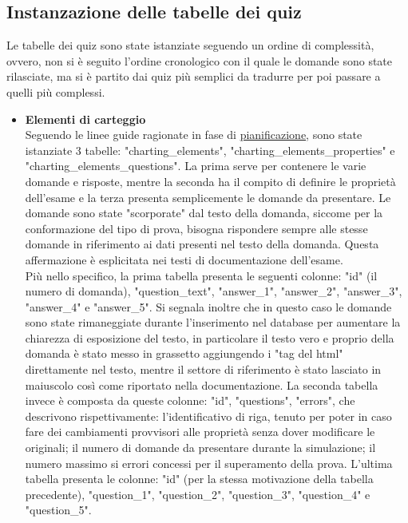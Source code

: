\subsection{Instanzazione delle tabelle dei quiz}
Le tabelle dei quiz sono state istanziate seguendo un ordine di complessità, ovvero, non si è seguito l'ordine cronologico con il quale le domande sono state rilasciate, ma si è partito dai quiz più semplici da tradurre per poi passare a quelli più complessi.\\
\begin{itemize}
	\item \textbf{Elementi di carteggio}\\
	Seguendo le linee guide ragionate in fase di  \hyperref[cap:Introduzione]{pianificazione}, sono state istanziate 3 tabelle: "charting_elements",  "charting_elements_properties" e "charting_elements_questions". La prima serve per contenere le varie domande e risposte, mentre la seconda ha il compito di definire le proprietà dell'esame e la terza presenta semplicemente le domande da presentare. Le domande sono state "scorporate" dal testo della domanda, siccome per la conformazione del tipo di prova, bisogna rispondere sempre alle stesse domande in riferimento ai dati presenti nel testo della domanda. Questa affermazione è esplicitata nei testi di documentazione dell'esame.\\ 
	Più nello specifico, la prima tabella presenta le seguenti colonne: "id" (il numero di domanda), "question_text", "answer_1", "answer_2", "answer_3", "answer_4" e "answer_5". Si segnala inoltre che in questo caso le domande sono state rimaneggiate durante l'inserimento nel database per aumentare la chiarezza di esposizione del testo, in particolare il testo vero e proprio della domanda è stato messo in grassetto aggiungendo i "tag del html" direttamente nel testo, mentre il settore di riferimento è stato lasciato in maiuscolo così come riportato nella documentazione. La seconda tabella invece è composta da queste colonne: "id", "questions", "errors", che descrivono rispettivamente: l'identificativo di riga, tenuto per poter in caso fare dei cambiamenti provvisori alle proprietà senza dover modificare le originali; il numero di domande da presentare durante la simulazione; il numero massimo si errori concessi per il superamento della prova. L'ultima tabella presenta le colonne: "id" (per la stessa motivazione della tabella precedente), "question_1", "question_2", "question_3", "question_4" e "question_5".  
	

\end{itemize}
